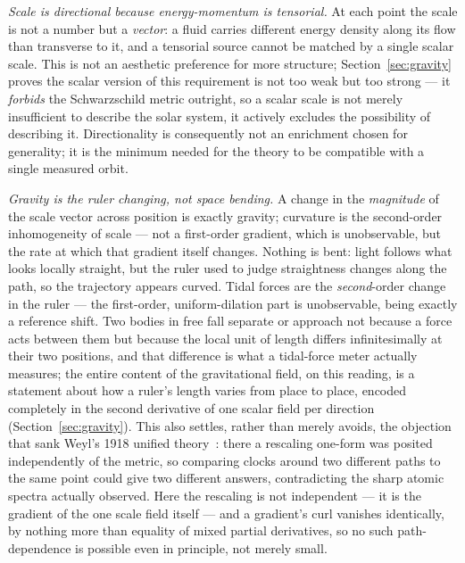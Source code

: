 \documentclass[pdflatex,sn-mathphys-num]{sn-jnl}
\theoremstyle{thmstyleone}
\theoremstyle{thmstylethree}
\theoremstyle{thmstyletwo}
\begin{document}
\emph{Scale is directional because energy-momentum is tensorial.} At
each point the scale is not a number but a \emph{vector}: a fluid
carries different energy density along its flow than transverse to it,
and a tensorial source cannot be matched by a single scalar scale. This
is not an aesthetic preference for more structure; Section~\ref{sec:gravity}
proves the scalar version of this requirement is not too weak but too
strong — it \emph{forbids} the Schwarzschild metric outright, so a
scalar scale is not merely insufficient to describe the solar system, it
actively excludes the possibility of describing it. Directionality is
consequently not an enrichment chosen for generality; it is the minimum
needed for the theory to be compatible with a single measured orbit.

\emph{Gravity is the ruler changing, not space bending.} A change in the
\emph{magnitude} of the scale vector across position is exactly gravity;
curvature is the second-order inhomogeneity of scale — not a first-order
gradient, which is unobservable, but the rate at which that gradient
itself changes. Nothing is bent: light follows what looks locally
straight, but the ruler used to judge straightness changes along the
path, so the trajectory appears curved. Tidal forces are the
\emph{second}-order change in the ruler — the first-order, uniform-dilation
part is unobservable, being exactly a reference shift. Two bodies in
free fall separate or approach not because a force acts between them but
because the local unit of length differs infinitesimally at their two
positions, and that difference is what a tidal-force meter actually
measures; the entire content of the gravitational field, on this
reading, is a statement about how a ruler's length varies from place to
place, encoded completely in the second derivative of one scalar field
per direction (Section~\ref{sec:gravity}). This also settles, rather
than merely avoids, the objection that sank Weyl's 1918 unified
theory~\cite{Weyl1918}: there a rescaling one-form was posited
independently of the metric, so comparing clocks around two different
paths to the same point could give two different answers, contradicting
the sharp atomic spectra actually observed. Here the rescaling is not
independent — it is the gradient of the one scale field itself — and a
gradient's curl vanishes identically, by nothing more than equality of
mixed partial derivatives, so no such path-dependence is possible even
in principle, not merely small.
\end{document}
